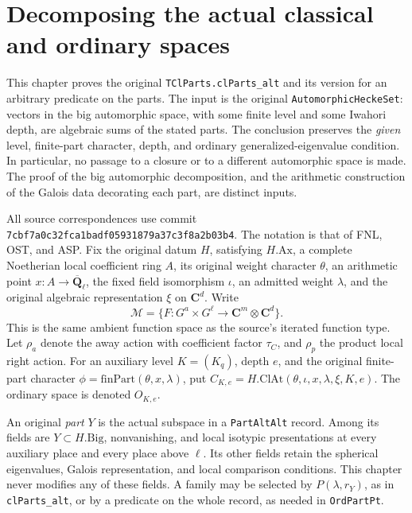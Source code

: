 \documentclass[11pt,a4paper]{article}
\numberwithin{equation}{section}
\theoremstyle{remark}\newtheorem{remark}[theorem]{Remark}
\begin{document}
\section{Decomposing the actual classical and ordinary spaces}
\label{sec:classical-parts-v43}

This chapter proves the original \texttt{TCl\allowbreak Parts.\allowbreak cl\allowbreak Parts\_\allowbreak alt} and its
version for an arbitrary predicate on the parts.  The input is the original
\texttt{Automorphic\allowbreak Hecke\allowbreak Set}: vectors in the big automorphic space, with
some finite level and some Iwahori depth, are algebraic sums of the stated
parts.  The conclusion preserves the \emph{given} level, finite-part
character, depth, and ordinary generalized-eigenvalue condition.  In
particular, no passage to a closure or to a different automorphic space is
made.  The proof of the big automorphic decomposition, and the arithmetic
construction of the Galois data decorating each part, are distinct inputs.

All source correspondences use commit
\texttt{7cbf7a0c32fca1badf05931879a37c3f8a2b03b4}.
The notation is that of FNL, OST, and ASP.  Fix the original datum
\(H\), satisfying \(H.\mathrm{Ax}\), a complete Noetherian local
coefficient ring \(A\), its original weight character \(\theta\),
an arithmetic point \(x:A\to\overline{\mathbf Q}_\ell\),
the fixed field isomorphism \(\iota\), an admitted weight \(\lambda\),
and the original algebraic representation \(\xi\) on \(\mathbf C^d\).
Write
\[
 \mathcal M=\{F:G^a\times G^\ell\longrightarrow
                  \mathbf C^{m}\otimes\mathbf C^d\}.
\]
This is the same ambient function space as the source's iterated function
type.  Let \(\rho_a\) denote the away action with coefficient factor
\(\tau_C\), and \(\rho_p\) the product local right action.  For an
auxiliary level \(K=(K_q)\), depth \(e\), and the original finite-part
character \(\phi=\mathrm{finPart}(\theta,x,\lambda)\), put
\(C_{K,e}=H.\mathrm{ClAt}(\theta,\iota,x,\lambda,\xi,K,e)\).
The ordinary space is denoted \(O_{K,e}\).

An original \emph{part} \(Y\) is the actual subspace in a
\texttt{Part\allowbreak Alt\allowbreak Alt} record.  Among its fields are \(Y\subset H.\mathrm{Big}\),
nonvanishing, and local isotypic presentations at every auxiliary place
and every place above \(\ell\).  Its other fields retain the spherical
eigenvalues, Galois representation, and local comparison conditions.  This
chapter never modifies any of these fields.  A family may be selected by
\(P(\lambda,r_Y)\), as in \texttt{cl\allowbreak Parts\_\allowbreak alt}, or by a predicate on the
whole record, as needed in \texttt{Ord\allowbreak Part\allowbreak Pt}.
\end{document}
